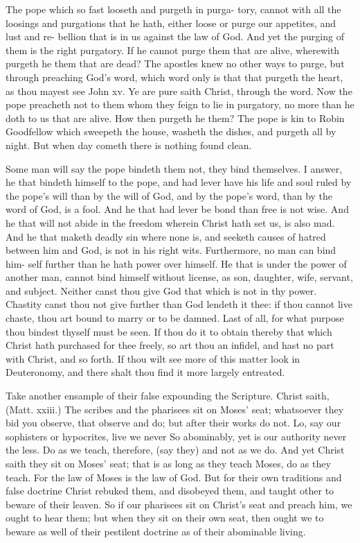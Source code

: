 \documentclass{custom}
\begin{document}
The pope which so fast looseth and purgeth in purga- 
tory, cannot with all the loosings and purgations that he 
hath, either loose or purge our appetites, and lust and re- 
bellion that is in us against the law of God. And yet 
the purging of them is the right purgatory. If he cannot 
purge them that are alive, wherewith purgeth he them 
that are dead? The apostles knew no other ways to 
purge, but through preaching God's word, which word 
only is that that purgeth the heart, as thou mayest see 
John xv. Ye are pure saith Christ, through the word. 
Now the pope preacheth not to them whom they feign to 
lie in purgatory, no more than he doth to us that are alive. 
How then purgeth he them? The pope is kin to Robin 
Goodfellow which sweepeth the house, washeth the dishes, 
and purgeth all by night. But when day cometh there 
is nothing found clean. 

Some man will say the pope bindeth them not, they 
bind themselves. I answer, he that bindeth himself to the 
pope, and had lever have his life and soul ruled by the 
pope's will than by the will of God, and by the pope's 
word, than by the word of God, is a fool. And he that 
had lever be bond than free is not wise. And he that will 
not abide in the freedom wherein Christ hath set us, is 
also mad. And he that maketh deadly sin where none is, 
and seeketh causes of hatred between him and God, is not 
in his right wits. Furthermore, no man can bind him- 
self further than he hath power over himself. He that 
is under the power of another man, cannot bind himself 
without license, as son, daughter, wife, servant, and 
subject. Neither canst thou give God that which is not 
in thy power. Chastity canst thou not give further than 
God lendeth it thee: if thou cannot live chaste, thou art 
bound to marry or to be damned. Last of all, for what 
purpose thou bindest thyself must be seen. If thou do 
it to obtain thereby that which Christ hath purchased for 
thee freely, so art thou an infidel, and hast no part with 
Christ, and so forth. If thou wilt see more of this matter 
look in Deuteronomy, and there shalt thou find it more 
largely entreated. 

Take another ensample of their false expounding the 
Scripture. Christ saith, (Matt. xxiii.) The scribes and 
the pharisees sit on Moses' seat; whatsoever they bid you 
observe, that observe and do; but after their works do 
not. Lo, say our sophisters or hypocrites, live we never 
So abominably, yet is our authority never the less. Do 
as we teach, therefore, (say they) and not as we do. And 
yet Christ saith they sit on Moses' seat; that is as long as 
they teach Moses, do as they teach. For the law of 
Moses is the law of God. But for their own traditions 
and false doctrine Christ rebuked them, and disobeyed 
them, and taught other to beware of their leaven. So if 
our pharisees sit on Christ's seat and preach him, we 
ought to hear them; but when they sit on their own seat, 
then ought we to beware as well of their pestilent doctrine 
as of their abominable living. 
\end{document}
